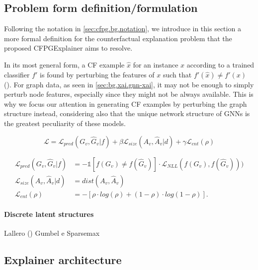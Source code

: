 \documentclass[binding=0.6cm]{sapthesis}
\newcommand{\mycite}[1]{(\cite{#1})}
\begin{document}
\bigskip
\subsection{Problem form definition/formulation}
\label{sec:cfpg.my.form-def}
Following the notation in \cref{sec:cfpg.bg.notation}, we introduce in this section a more formal definition for the counterfactual explanation problem that the proposed CFPGExplainer aims to resolve.

In its most general form, a CF example $\hat{x}$ for an instance $x$ according to a trained classifier $f'$ is found by perturbing the features of $x$ such that $f'(\hat{x}) \ne f'(x)$ (\cite{wachter2018-GDPR}). For graph data, as seen in \cref{sec:bg.xai.gnn-xai}, it may not be enough to simply perturb node features, especially since they might not be always available. This is why we focus our attention in generating CF examples by perturbing the graph structure instead, considering also that the unique network structure of GNNs is the greatest peculiarity of these models. 


\begin{equation}
    \mathcal{L} = \mathcal{L}_{pred}(G_v,\hat{G}_v|f) + \beta \mathcal{L}_{size}(A_v,\hat{A}_v|d) + \gamma \mathcal{L}_{ent}(\rho) 
    \label{eq:cfpg.bg.cfpg-loss}
\end{equation}

\begin{align}
    \mathcal{L}_{pred}(G_v,\hat{G}_v|f) &= -\mathbb{1}[f(G_v) \ne f(\hat{G}_v)] \cdot \mathcal{L}_{NLL}(f(G_v),f(\hat{G}_v))) \\
    \mathcal{L}_{size}(A_v,\hat{A}_v|d) &= dist(A_v,\hat{A}_v) \\
    \mathcal{L}_{ent}(\rho) &= -[\rho \cdot log(\rho) + (1 - \rho)\cdot log(1 - \rho)].
\end{align}
\label{eq:cfpg.bg.cfpg-all-losses}


\paragraph{Discrete latent structures}
\label{sec:cfpg.my.discrete-latent}
Lallero \mycite{niculae2023-discrete} Gumbel e Sparsemax


\subsection{Explainer architecture}
\label{sec:cfpg.my.model}
\end{document}
